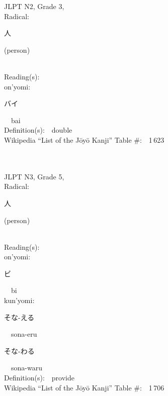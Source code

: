 \begin{multicols}{2}
{JLPT N2, Grade 3, \\Radical:\ \ {\begin{CJK}{UTF8}{min} 人 \end{CJK}} (person) } \\
Reading(s):\ \ \\
{\hspace*{1em}}on'yomi:\ \ \\
{\hspace*{2em}}{\begin{CJK}{UTF8}{min} バイ \end{CJK}}\ \ bai\ \ \\
Definition(s):\ \ double \\
Wikipedia ``List of the J\=oy\=o Kanji'' Table \#:\ \ 1\,623 \\
\ \ \\
{\fontsize{34pt}{40pt}  }\ \ \\  %
{JLPT N3, Grade 5, \\Radical:\ \ {\begin{CJK}{UTF8}{min} 人 \end{CJK}} (person) } \\
Reading(s):\ \ \\
{\hspace*{1em}}on'yomi:\ \ \\
{\hspace*{2em}}{\begin{CJK}{UTF8}{min} ビ \end{CJK}}\ \ bi\ \ \\
{\hspace*{1em}}kun'yomi:\ \ \\
{\hspace*{2em}}{\begin{CJK}{UTF8}{min} そな-える \end{CJK}}\ \ sona-eru\ \ \\
{\hspace*{2em}}{\begin{CJK}{UTF8}{min} そな-わる \end{CJK}}\ \ sona-waru\ \ \\
Definition(s):\ \ provide \\
Wikipedia ``List of the J\=oy\=o Kanji'' Table \#:\ \ 1\,706 \\
\ \ \\
{\fontsize{34pt}{40pt}  }\ \ \\  %

\end{multicols}
